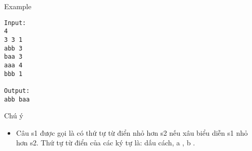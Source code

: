 Example
\begin{verbatim}
Input:
4
3 3 1
abb 3
baa 3
aaa 4
bbb 1

Output:
abb baa
\end{verbatim}
Chú ý
\begin{itemize}
	\item Câu s1 được gọi là có thứ tự từ điển nhỏ hơn s2 nếu xâu biểu diễn s1 nhỏ hơn s2. Thứ tự từ điển của các ký tự là: dấu cách, a , b .
\end{itemize}